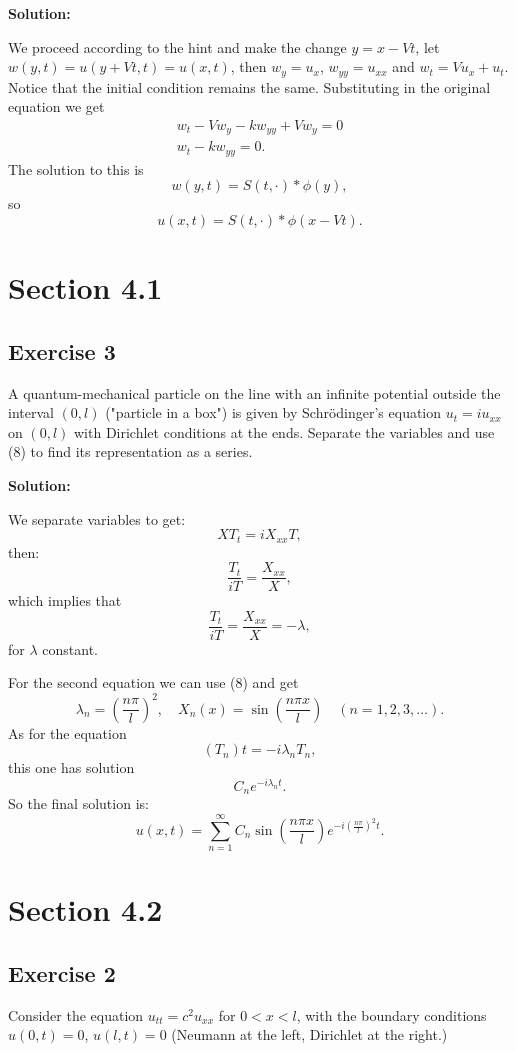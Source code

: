 \documentclass{article}
\begin{document}
\textbf{Solution:}

We proceed according to the hint and make the change $y=x-Vt$, let
$w(y,t)=u(y+Vt,t)=u(x,t)$, then $w_y=u_x$, $w_{yy}=u_{xx}$ and $w_t=Vu_x+u_t$.
Notice that the initial condition remains the same.
Substituting in the original equation we get
\begin{align*}
w_t-Vw_y -kw_{yy}+Vw_y=0\\
w_t-kw_{yy}=0.
\end{align*}
The solution to this is
\[
    w(y,t)=S(t,\cdot)\ast \phi(y),
\]
so
\[
    u(x,t)=S(t,\cdot)\ast \phi(x-Vt).
\]
\section{Section 4.1}
\subsection{Exercise 3}
A quantum-mechanical particle on the line with an infinite potential outside
the interval $(0,l)$ ("particle in a box") is given by Schr\"odinger's equation
$u_t=iu_{xx}$ on $(0,l)$ with Dirichlet conditions at the ends. Separate the
variables and use (8) to find its representation as a series.

\textbf{Solution:}


We separate variables to get:
\[
    XT_t=iX_{xx}T,
\]
then:
\[
    \frac{T_t}{iT}=\frac{X_{xx}}{X},
\]
which implies that
\[
    \frac{T_t}{iT}=\frac{X_{xx}}{X}=-\lambda,
\]
for $\lambda$ constant.

For the second equation we can use (8) and get
\[
    \lambda_n=\left(\frac{n\pi}{l}\right)^2,\quad X_n(x)=\sin\left(\frac{n\pi
    x}{l}\right) \quad (n=1,2,3,\dots).
\]
As for the equation
\[
    (T_n)t=-i\lambda_n T_n,
\]
this one has solution
\[
    C_ne^{-i\lambda_nt}.
\]
So the final solution is:
\[
    u(x,t)=\sum_{n=1}^\infty C_n\sin\left(\frac{n\pi
    x}{l}\right)e^{-i\left(\frac{n\pi}{l}\right)^2t}.
\]
\section{Section 4.2}
\subsection{Exercise 2}
Consider the equation $u_{tt}=c^2u_{xx}$ for $0<x<l$, with the boundary
conditions $u(0,t)=0$, $u(l,t)=0$ (Neumann at the left, Dirichlet at the right.)
\end{document}
